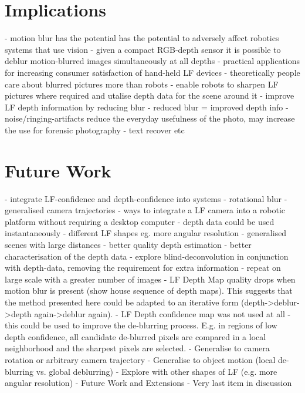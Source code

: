 \section{Implications}
\label{sec:implications}
- motion blur has the potential has the potential to adversely affect robotics systems that use vision
- given a compact RGB-depth sensor it is possible to deblur motion-blurred images simultaneously at all depths
- practical applications for increasing consumer satisfaction of hand-held LF devices
- theoretically people care about blurred pictures more than robots
- enable robots to sharpen LF pictures where required and utalise depth data for the scene around it
- improve LF depth information by reducing blur - reduced blur = improved depth info
- noise/ringing-artifacts reduce the everyday usefulness of the photo, may increase the use for forensic photography - text recover etc


\section{Future Work}
\label{sec:future_work}
- integrate LF-confidence and depth-confidence into systems
- rotational blur 
- generalised camera trajectories
- ways to integrate a LF camera into a robotic platform without requiring a desktop computer - depth data could be used instantaneously
- different LF shapes eg. more angular resolution
- generalised scenes with large distances 
- better quality depth estimation
- better characterisation of the depth data
- explore blind-deconvolution in conjunction with depth-data, removing the requirement for extra information
- repeat on large scale with a greater number of images
- LF Depth Map quality drops when motion blur is present (show house sequence of depth maps). This suggests that the method presented here could be adapted to an iterative form (depth->deblur->depth again->deblur again).
- LF Depth confidence map was not used at all - this could be used to improve the de-blurring process. E.g. in regions of low depth confidence, all candidate de-blurred pixels are compared in a local neighborhood and the sharpest pixels are selected.
- Generalise to camera rotation or arbitrary camera trajectory
- Generalise to object motion (local de-blurring vs. global deblurring)
- Explore with other shapes of LF (e.g. more angular resolution)
- Future Work and Extensions - Very last item in discussion

